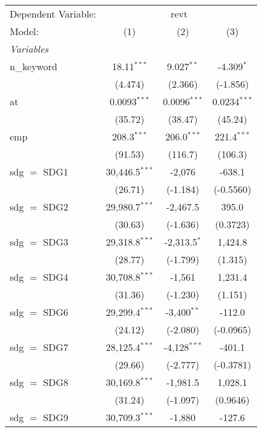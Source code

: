
\begingroup
\centering
\begin{tabular}{lccc}
   \tabularnewline \midrule \midrule
   Dependent Variable: & \multicolumn{3}{c}{revt}\\
   Model:        & (1)              & (2)             & (3)\\  
   \midrule
   \emph{Variables}\\
   n\_keyword    & 18.11$^{***}$    & 9.027$^{**}$    & -4.309$^{*}$\\   
                 & (4.474)          & (2.366)         & (-1.856)\\   
   at            & 0.0093$^{***}$   & 0.0096$^{***}$  & 0.0234$^{***}$\\   
                 & (35.72)          & (38.47)         & (45.24)\\   
   emp           & 208.3$^{***}$    & 206.0$^{***}$   & 221.4$^{***}$\\   
                 & (91.53)          & (116.7)         & (106.3)\\   
   sdg $=$ SDG1  & 30,446.5$^{***}$ & -2,076          & -638.1\\   
                 & (26.71)          & (-1.184)        & (-0.5560)\\   
   sdg $=$ SDG2  & 29,980.7$^{***}$ & -2,467.5        & 395.0\\   
                 & (30.63)          & (-1.636)        & (0.3723)\\   
   sdg $=$ SDG3  & 29,318.8$^{***}$ & -2,313.5$^{*}$  & 1,424.8\\   
                 & (28.77)          & (-1.799)        & (1.315)\\   
   sdg $=$ SDG4  & 30,708.8$^{***}$ & -1,561          & 1,231.4\\   
                 & (31.36)          & (-1.230)        & (1.151)\\   
   sdg $=$ SDG6  & 29,299.4$^{***}$ & -3,400$^{**}$   & -112.0\\   
                 & (24.12)          & (-2.080)        & (-0.0965)\\   
   sdg $=$ SDG7  & 28,125.4$^{***}$ & -4,128$^{***}$  & -401.1\\   
                 & (29.66)          & (-2.777)        & (-0.3781)\\   
   sdg $=$ SDG8  & 30,169.8$^{***}$ & -1,981.5        & 1,028.1\\   
                 & (31.24)          & (-1.097)        & (0.9646)\\   
   sdg $=$ SDG9  & 30,709.3$^{***}$ & -1,880          & -127.6\\   

\end{tabular}
